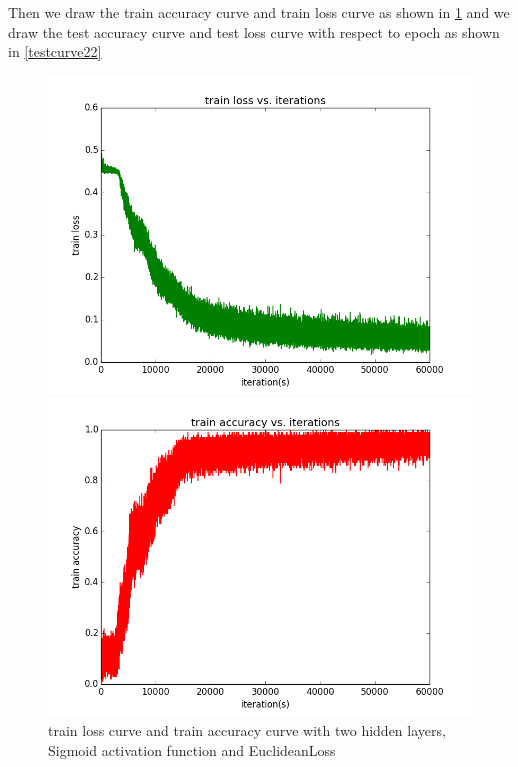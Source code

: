 \documentclass{elegantbook}
\begin{document}
Then we draw the train accuracy curve and train loss curve as shown in \ref{traincurve22} and we draw the test accuracy curve and test loss curve with respect to epoch as shown in \ref{testcurve22}
\begin{figure}[!ht]
	\centering
	\begin{minipage}[t]{0.45\textwidth}
		\centering
		\includegraphics[width=\textwidth]{trainloss2se}
	\end{minipage}
	\begin{minipage}[t]{0.45\textwidth}
		\centering
		\includegraphics[width=\textwidth]{trainacc2se}
	\end{minipage}
	\caption{\label{traincurve22}train loss curve and train accuracy curve with two hidden layers, Sigmoid activation function and EuclideanLoss}
\end{figure}
\end{document}

